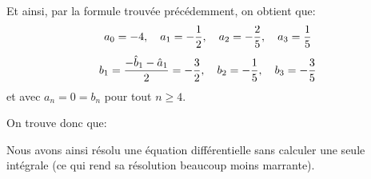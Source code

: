 \documentclass[a4paper]{article}
\begin{document}
{{        Et ainsi, par la formule trouvée précédemment, on obtient que: 
        \[a_0 = -4, \quad a_1 = -\frac{1}{2}, \quad a_2 = -\frac{2}{5}, \quad a_3 = \frac{1}{5}\] 
        \[b_1 = \frac{-\hat{b}_1 - \hat{a}_1}{2} = -\frac{3}{2}, \quad b_2 = -\frac{1}{5}, \quad b_3 = -\frac{3}{5}\]
        et avec $a_n = 0 = b_n$ pour tout $n \geq 4$.

        On trouve donc que: 
        
        Nous avons ainsi résolu une équation différentielle sans calculer une seule intégrale (ce qui rend sa résolution beaucoup moins marrante).
    }
}
\end{document}
